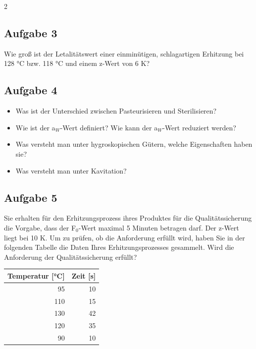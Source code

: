 \documentclass[a4paper,10pt]{article}
\newif\ifshowme
\begin{document}
\begin{multicols}{2}
\subsection*{Aufgabe 3}
Wie groß ist der Letalitätswert einer einminütigen, schlagartigen Erhitzung bei 128 °C
bzw. 118 °C und einem z-Wert von 6 K?

\ifshowme
\antwort{
\begin{align*}
L &= 10^{\frac{T_2-121,1}{z}} \\ \\
L_{128} &= 10^{\frac{128-121,1}{6}} = 14,125 \\
L_{118} &= 10^{\frac{118-121,1}{6}} = 0,304
\end{align*}
}
\else
\ppbig \vspace*{1cm}
\fi


\subsection*{Aufgabe 4}
\begin{itemize}
\item Was ist der Unterschied zwischen Pasteurisieren und Sterilisieren?
\item Wie ist der a$_W$-Wert definiert? Wie kann der a$_W$-Wert reduziert werden?
\item Was versteht man unter hygroskopischen Gütern, welche Eigenschaften haben sie?
\item Was versteht man unter Kavitation?
\end{itemize}

\ifshowme
\columnbreak
\else
\fi 

\subsection*{Aufgabe 5}
Sie erhalten für den Erhitzungsprozess ihres Produktes für die Qualitätssicherung die
Vorgabe, dass der F$_0$-Wert maximal 5 Minuten betragen darf. Der z-Wert liegt bei 10 K.
Um zu prüfen, ob die Anforderung erfüllt wird, haben Sie in der folgenden Tabelle die
Daten Ihres Erhitzungsprozesses gesammelt. Wird die Anforderung der
Qualitätssicherung erfüllt?

\begin{center}\begin{tabular}{r|r}
\rowcolor{miugray}
Temperatur [°C] & Zeit [s] \\ \hline
95 & 10 \\
110 & 15 \\
130 & 42 \\
120 & 35 \\
90 & 10 \\


\end{tabular}
\end{center}
\end{multicols}
\end{document}

